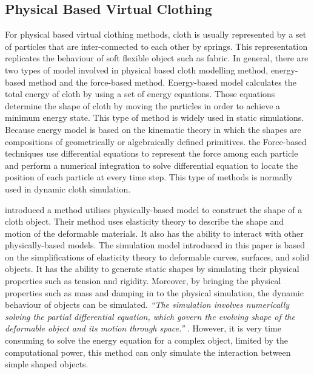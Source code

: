 \subsection{Physical Based Virtual Clothing}
For physical based virtual clothing methods, cloth is usually represented by a set of particles that are inter-connected to each other by springs. This representation replicates the behaviour of soft flexible object such as fabric. In general, there are two types of model involved in physical based cloth modelling method, energy-based method and the force-based method. Energy-based model calculates the total energy of cloth by using a set of energy equations. Those equations determine the shape of cloth by moving the particles in order to achieve a minimum energy state. This type of method is widely used in static simulations. Because energy model is based on the kinematic theory in which the shapes are compositions of geometrically or algebraically defined primitives. the Force-based techniques use differential equations to represent the force among each particle and perform a numerical integration to solve differential equation to locate the position of each particle at every time step. This type of methods is normally used in dynamic cloth simulation. 

 introduced a method utilises physically-based model to construct the shape of a cloth object. Their method uses elasticity theory to describe the shape and motion of the deformable materials. It also has the ability to interact with other physically-based models. The simulation model introduced in this paper is based on the simplifications of elasticity theory to deformable curves, surfaces, and solid objects. It has the ability to generate static shapes by simulating their physical properties such as tension and rigidity. Moreover, by bringing the physical properties such as mass and damping in to the physical simulation, the dynamic behaviour of objects can be simulated. \textit{``The simulation involves numerically solving the partial differential equation, which govern the evolving shape of the deformable object and its motion through space.''} . However, it is very time consuming to solve the energy equation for a complex object, limited by the computational power, this method can only simulate the interaction between simple shaped objects.




